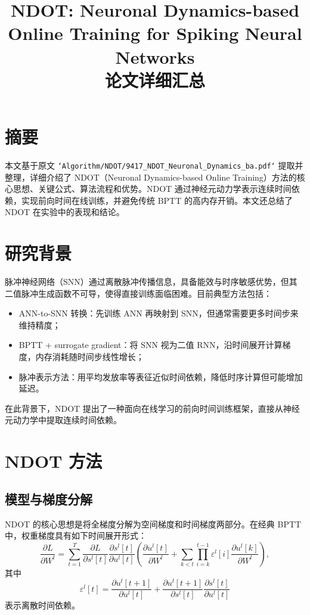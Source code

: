 \documentclass[journal,12pt,onecolumn]{IEEEtran}
\begin{document}
\title{NDOT: Neuronal Dynamics-based Online Training for Spiking Neural Networks \\ 论文详细汇总}
\author{}
\date{}
\maketitle

\section{摘要}
本文基于原文 \texttt{`Algorithm/NDOT/9417\_NDOT\_Neuronal\_Dynamics\_ba.pdf`} 提取并整理，详细介绍了 NDOT（Neuronal Dynamics-based Online Training）方法的核心思想、关键公式、算法流程和优势。NDOT 通过神经元动力学表示连续时间依赖，实现前向时间在线训练，并避免传统 BPTT 的高内存开销。本文还总结了 NDOT 在实验中的表现和结论。\cite{jiang2024ndot}

\section{研究背景}
脉冲神经网络（SNN）通过离散脉冲传播信息，具备能效与时序敏感优势，但其二值脉冲生成函数不可导，使得直接训练面临困难。目前典型方法包括：
\begin{itemize}[leftmargin=*]
  \item ANN-to-SNN 转换：先训练 ANN 再映射到 SNN，但通常需要更多时间步来维持精度；
  \item BPTT + surrogate gradient：将 SNN 视为二值 RNN，沿时间展开计算梯度，内存消耗随时间步线性增长；
  \item 脉冲表示方法：用平均发放率等表征近似时间依赖，降低时序计算但可能增加延迟。
\end{itemize}
在此背景下，NDOT 提出了一种面向在线学习的前向时间训练框架，直接从神经元动力学中提取连续时间依赖。

\section{NDOT 方法}
\subsection{模型与梯度分解}
NDOT 的核心思想是将全梯度分解为空间梯度和时间梯度两部分。在经典 BPTT 中，权重梯度具有如下时间展开形式：
\begin{equation}
  \frac{\partial L}{\partial W^l} = \sum_{t=1}^T \frac{\partial L}{\partial s^l[t]} \frac{\partial s^l[t]}{\partial u^l[t]} \left(\frac{\partial u^l[t]}{\partial W^l} + \sum_{k<t} \prod_{i=k}^{t-1} \varepsilon^l[i] \frac{\partial u^l[k]}{\partial W^l}\right),
\end{equation}
其中
\begin{equation}
  \varepsilon^l[t] = \frac{\partial u^l[t+1]}{\partial u^l[t]} + \frac{\partial u^l[t+1]}{\partial s^l[t]} \frac{\partial s^l[t]}{\partial u^l[t]}
\end{equation}
表示离散时间依赖。
\end{document}

